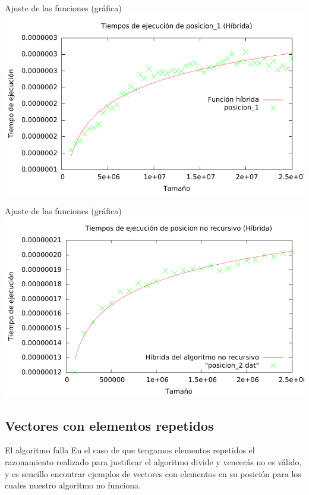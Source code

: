 \begin{frame}{Ajuste de las funciones (gráfica)}
	\includegraphics[width=\textwidth]{img/posicion_1_hibrida.pdf}
\end{frame}

\begin{frame}{Ajuste de las funciones (gráfica)}
	\includegraphics[width=\textwidth]{img/posicion_2_hibrida.pdf}
\end{frame}

\subsection{Vectores con elementos repetidos}

\begin{frame}{El algoritmo falla}
En el caso de que tengamos elementos repetidos el razonamiento realizado para justificar el algoritmo divide y vencerás no es válido, y es sencillo encontrar ejemplos de vectores con elementos en su posición para los cuales nuestro algoritmo no funciona.
\end{frame}

